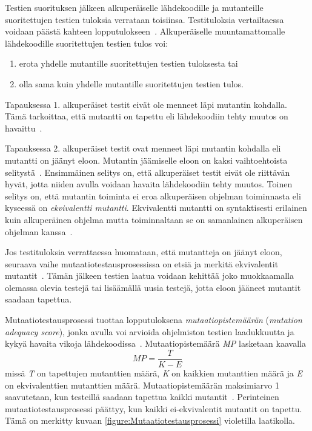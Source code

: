 \documentclass[finnish, grading]{tktltiki2}
\theoremstyle{definition}
\theoremstyle{remark}
\begin{document}
Testien suorituksen jälkeen alkuperäiselle lähdekoodille ja mutanteille suoritettujen testien tuloksia verrataan toisiinsa. Testituloksia vertailtaessa voidaan päästä kahteen lopputulokseen~\cite[s. 36]{DeMillo:Lipton:Sayward:1978}. Alkuperäiselle muuntamattomalle lähdekoodille suoritettujen testien tulos voi: 
\begin{enumerate}
  \item erota yhdelle mutantille suoritettujen testien tuloksesta tai
  \item olla sama kuin yhdelle mutantille suoritettujen testien tulos.
\end{enumerate}

Tapauksessa 1. alkuperäiset testit eivät ole menneet läpi mutantin kohdalla. Tämä tarkoittaa, että mutantti on tapettu eli lähdekoodiin tehty muutos on havaittu~\cite[s. 36]{DeMillo:Lipton:Sayward:1978}.

Tapauksessa 2. alkuperäiset testit ovat menneet läpi mutantin kohdalla eli mutantti on jäänyt eloon. Mutantin jäämiselle eloon on kaksi vaihtoehtoista selitystä~\cite[s. 36]{DeMillo:Lipton:Sayward:1978}. Ensimmäinen selitys on, että alkuperäiset testit eivät ole riittävän hyvät, jotta niiden avulla voidaan havaita lähdekoodiin tehty muutos. Toinen selitys on, että mutantin toiminta ei eroa alkuperäisen ohjelman toiminnasta eli kyseessä on \textit{ekvivalentti mutantti}. Ekvivalentti mutantti on syntaktisesti erilainen kuin alkuperäinen ohjelma mutta toiminnaltaan se on samanlainen alkuperäisen ohjelman kanssa~\cite[s. 652]{Jia:Harman:2011}.

Jos testituloksia verrattaessa huomataan, että mutantteja on jäänyt eloon, seuraava vaihe mutaatiotestausprosessissa on etsiä ja merkitä ekvivalentit mutantit~\cite[s. 36]{Offutt:Untch:2001}. Tämän jälkeen testien laatua voidaan kehittää joko muokkaamalla olemassa olevia testejä tai lisäämällä uusia testejä, jotta eloon jääneet mutantit saadaan tapettua.

Mutaatiotestausprosessi tuottaa lopputuloksena \textit{mutaatiopistemäärän} (\textit{mutation adequacy score}), jonka avulla voi arvioida ohjelmiston testien laadukkuutta ja kykyä havaita vikoja lähdekoodissa~\cite[s. 652]{Jia:Harman:2011}. Mutaatiopistemäärä \textit{MP} lasketaan kaavalla 
\begin{equation}
MP = \frac{T}{K - E}
\end{equation}
missä \textit{T} on tapettujen mutanttien määrä, \textit{K} on kaikkien mutanttien määrä ja \textit{E} on ekvivalenttien mutanttien määrä. Mutaatiopistemäärän maksimiarvo 1 saavutetaan, kun testeillä saadaan tapettua kaikki mutantit~\cite[s. 36]{Offutt:Untch:2001}. Perinteinen mutaatiotestausprosessi päättyy, kun kaikki ei-ekvivalentit mutantit on tapettu. Tämä on merkitty kuvaan \ref{figure:Mutaatiotestausprosessi} violetilla laatikolla.
\end{document}
